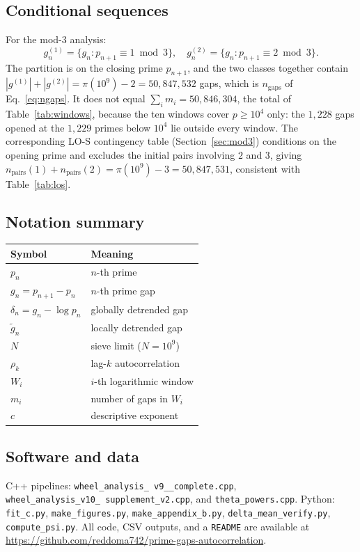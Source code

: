 \documentclass[11pt]{article}
\newcommand{\RepoURL}{https://github.com/reddoma742/prime-gaps-autocorrelation}
\begin{document}
\subsection{Conditional sequences}
For the mod-3 analysis:
\begin{equation}
g^{(1)}_n = \{g_n : p_{n+1} \equiv 1 \bmod 3\}, \quad
g^{(2)}_n = \{g_n : p_{n+1} \equiv 2 \bmod 3\}.
\end{equation}
The partition is on the closing prime $p_{n+1}$, and the two classes
together contain $|g^{(1)}| + |g^{(2)}| = \pi(10^9) - 2 = 50{,}847{,}532$
gaps, which is $n_{\text{gaps}}$ of
Eq.~\eqref{eq:ngaps}. It does not equal $\sum_i m_i =
50{,}846{,}304$, the total of Table~\ref{tab:windows}, because the ten
windows cover $p \geq 10^4$ only: the $1{,}228$ gaps opened at the
$1{,}229$ primes below $10^4$ lie outside every window. The
corresponding LO-S
contingency table (Section~\ref{sec:mod3}) conditions on the opening
prime and excludes the initial pairs involving $2$ and $3$, giving
$n_{\text{pairs}}(1) + n_{\text{pairs}}(2) = \pi(10^9) - 3 =
50{,}847{,}531$, consistent with Table~\ref{tab:los}.

\subsection{Notation summary}
\begin{table}[H]\centering
\begin{tabular}{ll}
\toprule
Symbol & Meaning \\
\midrule
$p_n$ & $n$-th prime \\
$g_n = p_{n+1} - p_n$ & $n$-th prime gap \\
$\delta_n = g_n - \log p_n$ & globally detrended gap \\
$\tilde g_n$ & locally detrended gap \\
$N$ & sieve limit ($N = 10^9$) \\
$\rho_k$ & lag-$k$ autocorrelation \\
$W_i$ & $i$-th logarithmic window \\
$m_i$ & number of gaps in $W_i$ \\
$c$ & descriptive exponent \\
\bottomrule
\end{tabular}
\end{table}

\subsection{Software and data}
C++ pipelines: \texttt{wheel\_\allowbreak analysis\_\allowbreak
v9\_\_\allowbreak complete.cpp},\\
\texttt{wheel\_\allowbreak analysis\_\allowbreak v10\_\allowbreak
supplement\_\allowbreak v2.cpp}, and
\texttt{theta\_\allowbreak powers.cpp}.
Python: \texttt{fit\_c.py}, \texttt{make\_\allowbreak figures.py},
\texttt{make\_\allowbreak appendix\_\allowbreak b.py},
\texttt{delta\_\allowbreak mean\_\allowbreak verify.py},
\texttt{compute\_\allowbreak psi.py}.
All code, CSV outputs, and a \texttt{README} are available at
\url{\RepoURL}.
\end{document}
